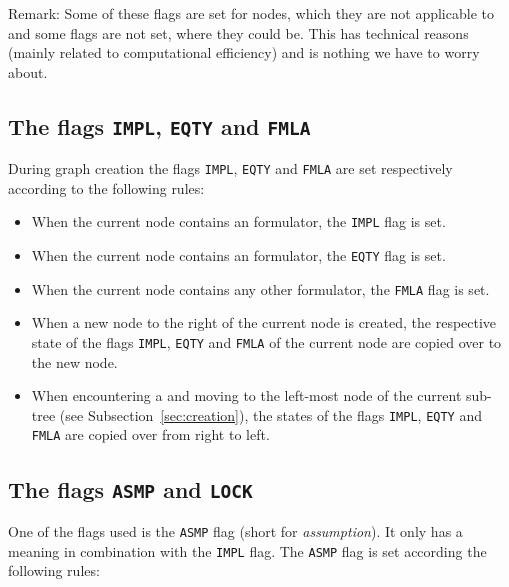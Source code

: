 \documentclass[british]{article}
\newcommand\m[1]{\pcode{\texttt{#1}}}
\begin{document}
Remark: Some of these flags are set for nodes, which they are not applicable to
and some flags are not set, where they could be.
This has technical reasons (mainly related to computational efficiency) and is
nothing we have to worry about.

\pagebreak{}

\subsection{The flags \texttt{IMPL}, \texttt{EQTY} and \texttt{FMLA}}
During graph creation the flags \texttt{IMPL},
\texttt{EQTY} and \texttt{FMLA} are set respectively according to the following
rules:

\begin{itemize}
	\item
		When the current node contains an \m{=>} formulator, the \texttt{IMPL}
		flag is set.
	\item
		When the current node contains an \m{=} formulator, the \texttt{EQTY}
		flag is set.
	\item
		When the current node contains any other formulator, the \texttt{FMLA}
		flag is set.
	\item
		When a new node to the right of the current node is created, the
		respective state of the flags \texttt{IMPL}, \texttt{EQTY} and
		\texttt{FMLA} of the current node are copied over to the new node.
	\item
		When encountering a \m{]} and moving to the left-most node of the
		current sub-tree (see Subsection~\ref{sec:creation}), the states of the
		flags \texttt{IMPL}, \texttt{EQTY} and \texttt{FMLA} are copied over
		from right to left.
\end{itemize}

\subsection{The flags \texttt{ASMP} and \texttt{LOCK}}

One of the flags used is the \texttt{ASMP} flag (short for \emph{assumption}).
It only has a meaning in combination with the \texttt{IMPL} flag. 
\medskip
The \texttt{ASMP} flag is set according the following rules:
\end{document}
